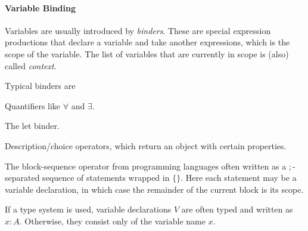 \paragraph{Variable Binding}
Variables are usually introduced by \emph{binders}.
These are special expression productions that declare a variable and take another expressions, which is the scope of the variable.
The list of variables that are currently in scope is (also) called \emph{context}.

Typical binders are
\begin{compactitem}
\item Quantifiers like $\forall$ and $\exists$.
\item The let binder.
\item Description/choice operators, which return an object with certain properties.
\item The block-sequence operator from programming languages often written as a $;$-separated sequence of statements wrapped in $\{\}$.
Here each statement may be a variable declaration, in which case the remainder of the current block is its scope.
\end{compactitem}

If a type system is used, variable declarations $V$ are often typed and written as $x:A$.
Otherwise, they consist only of the variable name $x$.

